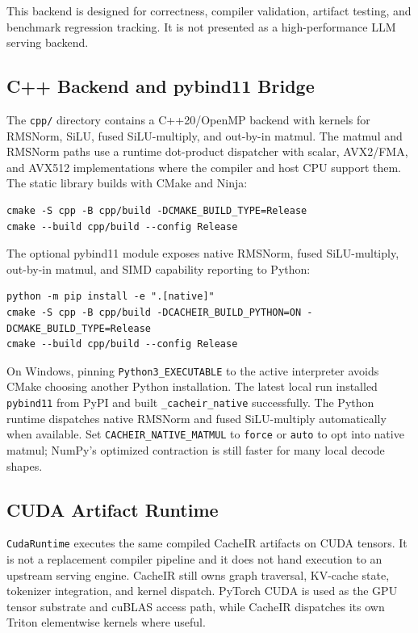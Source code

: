 \documentclass[11pt]{article}
\begin{document}
This backend is designed for correctness, compiler validation, artifact testing,
and benchmark regression tracking. It is not presented as a high-performance LLM
serving backend.

\subsection{C++ Backend and pybind11 Bridge}

The \texttt{cpp/} directory contains a C++20/OpenMP backend with kernels for
RMSNorm, SiLU, fused SiLU-multiply, and out-by-in matmul. The matmul and RMSNorm
paths use a runtime dot-product dispatcher with scalar, AVX2/FMA, and AVX512
implementations where the compiler and host CPU support them. The static library
builds with CMake and Ninja:

\begin{lstlisting}
cmake -S cpp -B cpp/build -DCMAKE_BUILD_TYPE=Release
cmake --build cpp/build --config Release
\end{lstlisting}

The optional pybind11 module exposes native RMSNorm, fused SiLU-multiply,
out-by-in matmul, and SIMD capability reporting to Python:

\begin{lstlisting}
python -m pip install -e ".[native]"
cmake -S cpp -B cpp/build -DCACHEIR_BUILD_PYTHON=ON -DCMAKE_BUILD_TYPE=Release
cmake --build cpp/build --config Release
\end{lstlisting}

On Windows, pinning \texttt{Python3\_EXECUTABLE} to the active interpreter avoids
CMake choosing another Python installation. The latest local run installed
\texttt{pybind11} from PyPI and built \texttt{\_cacheir\_native} successfully.
The Python runtime dispatches native RMSNorm and fused SiLU-multiply
automatically when available. Set \texttt{CACHEIR\_NATIVE\_MATMUL} to
\texttt{force} or \texttt{auto} to opt into native matmul; NumPy's optimized
contraction is still faster for many local decode shapes.

\subsection{CUDA Artifact Runtime}

\texttt{CudaRuntime} executes the same compiled CacheIR artifacts on CUDA
tensors. It is not a replacement compiler pipeline and it does not hand execution
to an upstream serving engine. CacheIR still owns graph traversal, KV-cache
state, tokenizer integration, and kernel dispatch. PyTorch CUDA is used as the
GPU tensor substrate and cuBLAS access path, while CacheIR dispatches its own
Triton elementwise kernels where useful.
\end{document}
